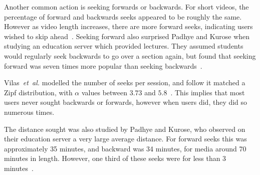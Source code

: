     Another common action is seeking forwards or backwards. For short videos, the percentage of forward and backwards seeks appeared to be roughly the same. However as video length increases, there are more forward seeks, indicating users wished to skip ahead~\cite{almeida2001aem}. Seeking forward also surprised Padhye and Kurose when studying an education server which provided lectures. They assumed students would regularly seek backwards to go over a section again, but found that seeking forward was seven times more popular than seeking backwards~\cite{padhye1998esc}.

    Vilas~\emph{et~al.} modelled the number of seeks per session, and follow it matched a Zipf distribution, with $\alpha$ values between $3.73$ and $5.8$~\cite{vilas2005uba}. This implies that most users never sought backwards or forwards, however when users did, they did so numerous times.


    The distance sought was also studied by Padhye and Kurose, who observed on their education server a very large average distance. For forward seeks this was approximately 35 minutes, and backward was 34 minutes, for media around 70 minutes in length. However, one third of these seeks were for less than 3 minutes~\cite{padhye1999cmc}.



